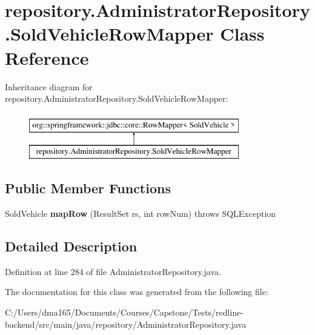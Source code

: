 \hypertarget{classrepository_1_1_administrator_repository_1_1_sold_vehicle_row_mapper}{}\section{repository.\+Administrator\+Repository.\+Sold\+Vehicle\+Row\+Mapper Class Reference}
\label{classrepository_1_1_administrator_repository_1_1_sold_vehicle_row_mapper}
Inheritance diagram for repository.\+Administrator\+Repository.\+Sold\+Vehicle\+Row\+Mapper\+:\begin{figure}[H]
\begin{center}
\leavevmode
\includegraphics[height=2.000000cm]{classrepository_1_1_administrator_repository_1_1_sold_vehicle_row_mapper}
\end{center}
\end{figure}
\subsection*{Public Member Functions}
\begin{DoxyCompactItemize}
\item 
\mbox{\label{classrepository_1_1_administrator_repository_1_1_sold_vehicle_row_mapper_a5ce3b03208ef3d656c03a29cd37702e2}} 
Sold\+Vehicle {\bfseries map\+Row} (Result\+Set rs, int row\+Num)  throws S\+Q\+L\+Exception 
\end{DoxyCompactItemize}


\subsection{Detailed Description}


Definition at line 284 of file Administrator\+Repository.\+java.



The documentation for this class was generated from the following file\+:\begin{DoxyCompactItemize}
\item 
C\+:/\+Users/dma165/\+Documents/\+Courses/\+Capstone/\+Tests/redline-\/backend/src/main/java/repository/Administrator\+Repository.\+java\end{DoxyCompactItemize}
